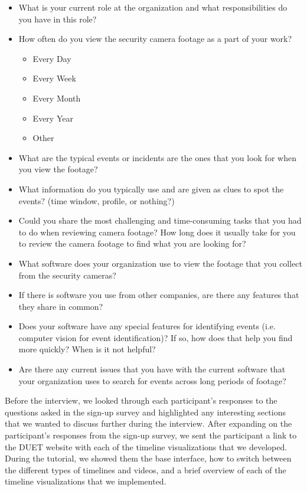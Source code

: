 \documentclass[doublespace,draft,nopageskip]{VTthesis} %
\begin{document}
\begin{itemize}
    \item What is your current role at the organization and what responsibilities do you have in this role?
    \item How often do you view the security camera footage as a part of your work? 
        \begin{itemize}
            \item Every Day
            \item Every Week
            \item Every Month
            \item Every Year
            \item Other
        \end{itemize}
    \item What are the typical events or incidents are the ones that you look for when you view the footage?
    \item What information do you typically use and are given as clues to spot the events? (time window, profile, or nothing?)
    \item Could you share the most challenging and time-consuming tasks that you had to do when reviewing camera footage? How long does it usually take for you to review the camera footage to find what you are looking for?
    \item What software does your organization use to view the footage that you collect from the security cameras?
    \item If there is software you use from other companies, are there any features that they share in common?
    \item Does your software have any special features for identifying events (i.e. computer vision for event identification)? If so, how does that help you find more quickly? When is it not helpful? 
    \item Are there any current issues that you have with the current software that your organization uses to search for events across long periods of footage?
\end{itemize}

Before the interview, we looked through each participant's responses to the questions asked in the sign-up survey and highlighted any interesting sections that we wanted to discuss further during the interview. After expanding on the participant's responses from the sign-up survey, we sent the participant a link to the DUET website with each of the timeline visualizations that we developed. During the tutorial, we showed them the base interface, how to switch between the different types of timelines and videos, and a brief overview of each of the timeline visualizations that we implemented.
\end{document}
